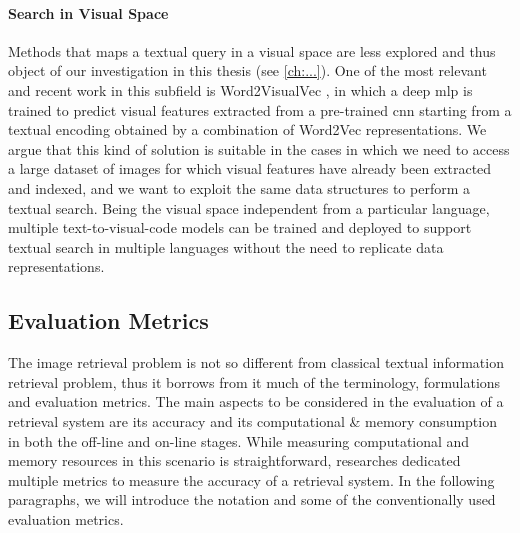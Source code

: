 \paragraph{Search in Visual Space}
Methods that maps a textual query in a visual space are less explored and thus object of our investigation in this thesis (see \ref{ch:...}).
One of the most relevant and recent work in this subfield is Word2VisualVec \cite{dong2018predicting}, in which a deep \gls{mlp} is trained to predict visual features extracted from a pre-trained \gls{cnn} starting from a textual encoding obtained by a combination of Word2Vec representations.
We argue that this kind of solution is suitable in the cases in which we need to access a large dataset of images for which visual features have already been extracted and indexed, and we want to exploit the same data structures to perform a textual search.
Being the visual space independent from a particular language, multiple text-to-visual-code models can be trained and deployed to support textual search in multiple languages without the need to replicate data representations.



\subsection{Evaluation Metrics}
The image retrieval problem is not so different from classical textual information retrieval problem, thus it borrows from it much of the terminology, formulations and evaluation metrics.
The main aspects to be considered in the evaluation of a retrieval system are its accuracy and its computational \& memory consumption in both the off-line and on-line stages.
While measuring computational and memory resources in this scenario is straightforward, researches dedicated multiple metrics to measure the accuracy of a retrieval system.
In the following paragraphs, we will introduce the notation and some of the conventionally used evaluation metrics.

